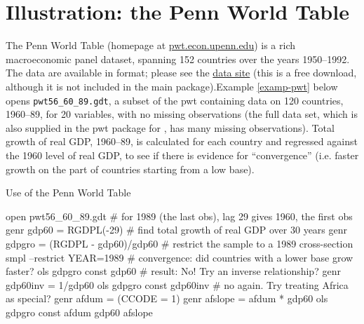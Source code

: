 \section{Illustration: the Penn World Table}
\label{PWT}

The Penn World Table (homepage at
\href{http://pwt.econ.upenn.edu/}{pwt.econ.upenn.edu}) is a rich
macroeconomic panel dataset, spanning 152 countries over the years
1950--1992.  The data are available in  format; please see
the 
\href{http://gretl.sourceforge.net/gretl_data.html}{data site} (this
is a free download, although it is not included in the main
 package).Example \ref{examp-pwt} below opens
\verb+pwt56_60_89.gdt+, a subset of the pwt containing data on 120
countries, 1960--89, for 20 variables, with no missing observations
(the full data set, which is also supplied in the pwt package for
, has many missing observations). Total growth of real GDP,
1960--89, is calculated for each country and regressed against the
1960 level of real GDP, to see if there is evidence for
``convergence'' (i.e. faster growth on the part of countries starting
from a low base).

\begin{script}[htbp]
  \caption{Use of the Penn World Table}
  \label{examp-pwt}

\begin{code}
          open pwt56_60_89.gdt 
          # for 1989 (the last obs), lag 29 gives 1960, the first obs 
          genr gdp60 = RGDPL(-29) 
          # find total growth of real GDP over 30 years
          genr gdpgro = (RGDPL - gdp60)/gdp60
          # restrict the sample to a 1989 cross-section 
          smpl --restrict YEAR=1989 
          # convergence: did countries with a lower base grow faster?  
          ols gdpgro const gdp60 
          # result: No! Try an inverse relationship?
          genr gdp60inv = 1/gdp60 
          ols gdpgro const gdp60inv 
          # no again.  Try treating Africa as special? 
          genr afdum = (CCODE = 1)
          genr afslope = afdum * gdp60 
          ols gdpgro const afdum gdp60 afslope 
\end{code}
\end{script}



